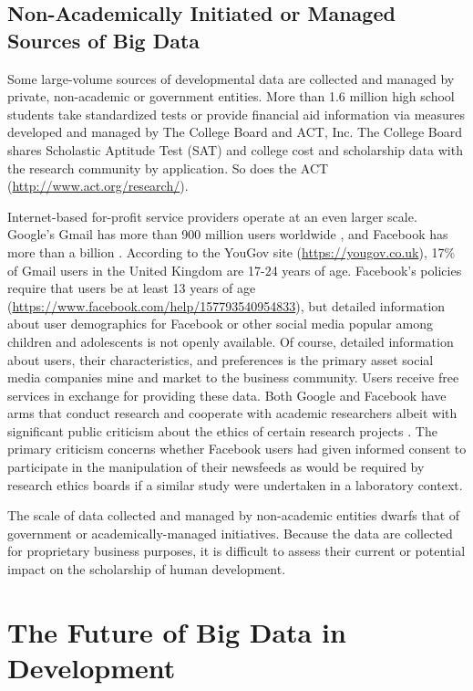 \documentclass[letterpaper,man,apacite,natbib]{apa6}
\begin{document}
\subsection{Non-Academically Initiated or Managed Sources of Big Data}

Some large-volume sources of developmental data are collected and managed by private, non-academic or government entities.
More than 1.6 million high school students \cite{lewin_more_2013} take standardized tests or provide financial aid information via measures developed and managed by The College Board and ACT, Inc.
The College Board shares Scholastic Aptitude Test (SAT) and college cost and scholarship data with the research community by application.
So does the ACT (\url{http://www.act.org/research/}).

Internet-based for-profit service providers operate at an even larger scale.
Google's Gmail has more than 900 million users worldwide \cite{lardinois_gmail_2015}, and Facebook has more than a billion \cite{facebook_2014}.
According to the YouGov site (\url{https://yougov.co.uk}), 17\% of Gmail users in the United Kingdom are 17-24 years of age.
Facebook's policies require that users be at least 13 years of age (\url{https://www.facebook.com/help/157793540954833}), but detailed information about user demographics for Facebook or other social media popular among children and adolescents is not openly available.
Of course, detailed information about users, their characteristics, and preferences is the primary asset social media companies mine and market to the business community.
Users receive free services in exchange for providing these data.
Both Google and Facebook have arms that conduct research and cooperate with academic researchers albeit with significant public criticism about the ethics of certain research projects \cite{meyer_everything_2014}.
The primary criticism concerns whether Facebook users had given informed consent to participate in the manipulation of their newsfeeds as would be required by research ethics boards if a similar study were undertaken in a laboratory context.

The scale of data collected and managed by non-academic entities dwarfs that of government or academically-managed initiatives.
Because the data are collected for proprietary business purposes, it is difficult to assess their current or potential impact on the scholarship of human development.

\section{The Future of Big Data in Development}
\end{document}
